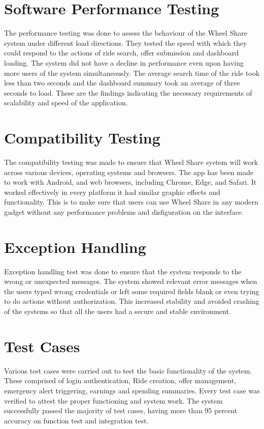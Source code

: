 \section{Software Performance Testing}
The performance testing was done to assess the behaviour of the Wheel Share system under different load directions. They tested the speed with which they could respond to the actions of ride search, offer submission and dashboard loading. The system did not have a decline in performance even upon having more users of the system simultaneously. The average search time of the ride took less than two seconds and the dashboard summary took an average of three seconds to load. These are the findings indicating the necessary requirements of scalability and speed of the application. 
\section{Compatibility Testing}
The compatibility testing was made to ensure that Wheel Share system will work across various devices, operating systems and browsers. The app has been made to work with Android, and web browsers, including Chrome, Edge, and Safari. It worked effectively in every platform it had similar graphic effects and functionality. This is to make sure that users can use Wheel Share in any modern gadget without any performance problems and disfiguration on the interface.
\section{Exception Handling}
Exception handling test was done to ensure that the system responds to the wrong or unexpected messages. The system showed relevant error messages when the users typed wrong credentials or left some required fields blank or even trying to do actions without authorization. This increased stability and avoided crashing of the systems so that all the users had a secure and stable environment. 

\section{Test Cases}
Various test cases were carried out to test the basic functionality of the system. These comprised of login authentication, Ride creation, offer management, emergency alert triggering, earnings and spending summaries. Every test case was verified to attest the proper functioning and system work. The system successfully passed the majority of test cases, having more than 95 percent accuracy on function test and integration test. 


